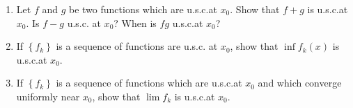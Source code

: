 \begin{problem}
  \hfill
  \begin{enumerate}[label=(\alph*),noitemsep]
  \item Let \(f\) and \(g\) be two functions which are u.s.c.\@ at
    \(x_0\). Show that \(f+g\) is u.s.c.\@ at \(x_0\). Is \(f-g\) u.s.c.\@
    at \(x_0\)? When is \(fg\) u.s.c.\@ at \(x_0\)?
  \item If \(\left\{f_k\right\}\) is a sequence of functions are u.s.c.\@
    at \(x_0\), show that \(\inf f_k(x)\) is u.s.c.\@ at \(x_0\).
  \item If \(\left\{f_k\right\}\) is a sequence of functions which are
    u.s.c.\@ at \(x_0\) and which converge uniformly near \(x_0\), show
    that \(\lim f_k\) is u.s.c.\@ at \(x_0\).
  \end{enumerate}
\end{problem}
